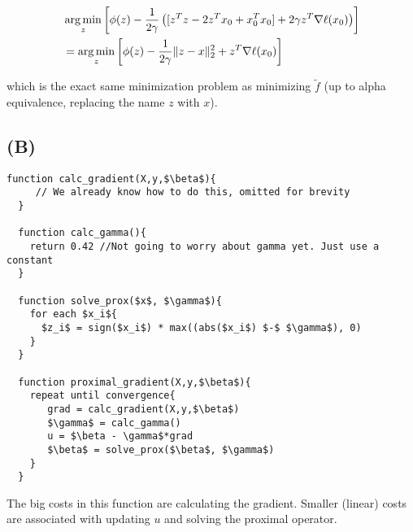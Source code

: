 \documentclass{article}
\DeclarePairedDelimiter\norm{\lVert}{\rVert}
\DeclareMathOperator*{\argmin}{arg\,min}
\begin{document}
\begin{align*}
    &\argmin_z \left[ \phi(z) - \frac{1}{2\gamma} \left(  [z^Tz - 2z^Tx_0 + x_0^Tx_0]  + 2\gamma z^T \nabla \ell(x_0)
                \right)  \right]\\
    &= \argmin_z \left[ \phi(z) - \frac{1}{2\gamma} \norm{z-x}_2^2  + z^T \nabla \ell(x_0) \right]
\end{align*}

which is the exact same minimization problem as minimizing $\widetilde{f}$ (up
to alpha equivalence, replacing the name $z$ with $x$).

\subsection*{(B)}

\begin{lstlisting}[mathescape=true]
  function calc_gradient(X,y,$\beta$){
     // We already know how to do this, omitted for brevity
  }

  function calc_gamma(){
    return 0.42 //Not going to worry about gamma yet. Just use a constant
  }

  function solve_prox($x$, $\gamma$){
    for each $x_i${
      $z_i$ = sign($x_i$) * max((abs($x_i$) $-$ $\gamma$), 0)
    }
  }

  function proximal_gradient(X,y,$\beta$){
    repeat until convergence{
       grad = calc_gradient(X,y,$\beta$)
       $\gamma$ = calc_gamma()
       u = $\beta - \gamma$*grad
       $\beta$ = solve_prox($\beta$, $\gamma$)
    }
  }
\end{lstlisting}

The big costs in this function are calculating the gradient. Smaller (linear) costs are
associated with updating $u$ and solving the proximal operator.
\end{document}
